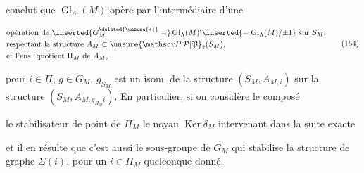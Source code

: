 
conclut que $\operatorname{Gl}_\Lambda(M)$ opère par l'intermédiaire d'une 

\[
 \begin{aligned}
 &\text{opération de } \inserted{G_M^{\deleted{\unsure{*}}}=}\operatorname{Gl}_\Lambda(M)' \inserted{=\operatorname{Gl}_\Lambda(M)/{\pm1}}\text{ sur } S_M,\\
 &\text{respectant la structure } A_M\subset\unsure{\mathscr P|\mathcal P|\mathfrak P}_2(S_M),\\
 &\text{et l'ens. quotient }\Pi_M\text{ de }A_M,
 \end{aligned}\tag*{(164)}
\]


pour $i\in\Pi$, $g\in G_M$, $g_{S_M}$ est un isom. de la structure $(S_M,A_{M,i})$ sur la structure $(S_M,A_{M,g_{\Pi_M}i})$. En particulier, si on  considère le composé


le stabilisateur  de  point de $\Pi_M$  le noyau  $\operatorname{Ker}\delta_M$ intervenant dans la suite exacte


et il en résulte que c'est aussi le sous-groupe de $G_M$ qui stabilise la structure de  graphe $\Sigma(i)$, pour un $i\in\Pi_M$ quelconque donné.

